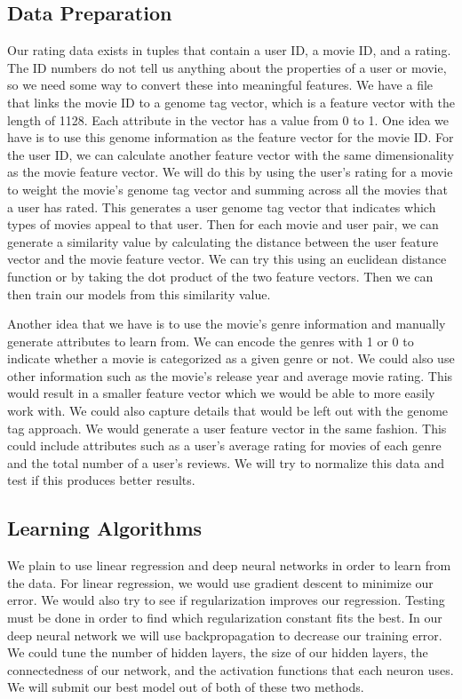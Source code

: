 \documentclass[11pt]{article}
\begin{document}
\subsection{Data Preparation}

Our rating data exists in tuples that contain a user ID, a movie ID, and a rating. The ID numbers do not tell us
anything about the properties of a user or movie, so we need some way to convert these into meaningful features.
We have a file that links the movie ID to a genome tag vector, which is a feature vector with the length of 1128. Each
attribute in the vector has a value from 0 to 1. One idea we have is to use this genome information as the feature
vector for the movie ID. For the user ID, we can calculate another feature vector with the same dimensionality as the
movie feature vector. We will do this by using the user's rating for a movie to weight the movie's genome tag vector
and summing across all the movies that a user has rated. This generates a user genome tag vector that indicates which types
of movies appeal to that user. Then for each movie and user pair, we can generate a similarity value by
calculating the distance between the user feature vector and the movie feature vector. We can try this using an euclidean
distance function or by taking the dot product of the two feature vectors. Then we can then train our models from this
similarity value.

Another idea that we have is to use the movie's genre information and manually generate attributes to learn from. We
can encode the genres with 1 or 0 to indicate whether a movie is categorized as a given genre or not. We could also
use other information such as the movie's release year and average movie rating. This would result in a smaller
feature vector which we would be able to more easily work with. We could also capture details that would be left
out with the genome tag approach. We would generate a user feature vector in the same fashion. This could include
attributes such as a user's average rating for movies of each genre and the total number of a user's reviews.
We will try to normalize this data and test if this produces better results.

\subsection{Learning Algorithms}

We plain to use linear regression and deep neural networks in order to learn from the data. For linear regression,
we would use gradient descent to minimize our error. We would also try to see if regularization improves
our regression. Testing must be done in order to find which regularization constant fits the best. In our deep neural
network we will use backpropagation to decrease our training error. We could tune the number of hidden layers, the
size of our hidden layers, the connectedness of our network, and the activation functions that each neuron uses.
We will submit our best model out of both of these two methods.
\end{document}
